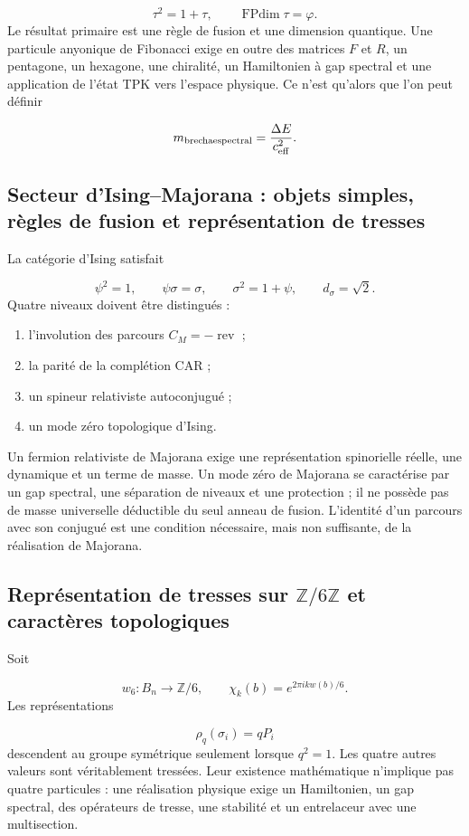 \[
 \tau^2=1+\tau,\qquad
 \operatorname{FPdim}\tau=\varphi.
\]
Le résultat primaire est une règle de fusion et une dimension quantique. Une particule anyonique de Fibonacci exige en outre des matrices \(F\) et \(R\), un pentagone, un hexagone, une chiralité, un Hamiltonien à gap spectral et une application de l'état TPK vers l'espace physique. Ce n'est qu'alors que l'on peut définir

\[
 m_{\rm brecha espectral}=\frac{\Delta E}{c_{\rm eff}^2}.
\]
\subsection{Secteur d'Ising–Majorana : objets simples, règles de fusion et représentation de tresses}
La catégorie d'Ising satisfait

\[
 \psi^2=1,\qquad
 \psi\sigma=\sigma,\qquad
 \sigma^2=1+\psi,\qquad
 d_\sigma=\sqrt2.
\]
Quatre niveaux doivent être distingués :

\begin{enumerate}
\item l'involution des parcours \(C_M=-\operatorname{rev}\) ;
\item la parité de la complétion CAR ;
\item un spineur relativiste autoconjugué ;
\item un mode zéro topologique d'Ising.
\end{enumerate}
Un fermion relativiste de Majorana exige une représentation spinorielle réelle, une dynamique et un terme de masse. Un mode zéro de Majorana se caractérise par un gap spectral, une séparation de niveaux et une protection ; il ne possède pas de masse universelle déductible du seul anneau de fusion. L'identité d'un parcours avec son conjugué est une condition nécessaire, mais non suffisante, de la réalisation de Majorana.

\subsection{Représentation de tresses sur \(\mathbb Z/6\mathbb Z\) et caractères topologiques}
Soit

\[
 w_6:B_n\longrightarrow\mathbb Z/6,
\qquad
 \chi_k(b)=e^{2\pi ikw(b)/6}.
\]
Les représentations

\[
 \rho_q(\sigma_i)=qP_i
\]
descendent au groupe symétrique seulement lorsque \(q^2=1\). Les quatre autres valeurs sont véritablement tressées. Leur existence mathématique n'implique pas quatre particules : une réalisation physique exige un Hamiltonien, un gap spectral, des opérateurs de tresse, une stabilité et un entrelaceur avec une multisection.


